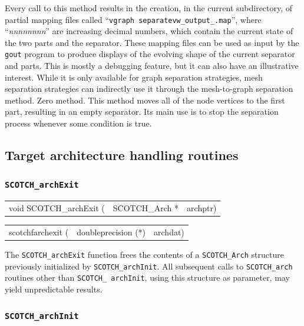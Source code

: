 \begin{itemize}
Every call to this method results in the creation, in the current
subdirectory, of partial mapping files called ``{\tt vgraph\lbt
separate\lbt vw\_\lbt output\_.map}'', where
``{\it nnnnnnnn}'' are increasing decimal numbers, which contain the
current state of the two parts and the separator. These mapping files
can be used as input by the {\tt gout} program to produce displays of
the evolving shape of the current separator and parts. This is mostly
a debugging feature, but it can also have an illustrative interest.
While it is only available for graph separation strategies, mesh
separation strategies can indirectly use it through the mesh-to-graph
separation method.
\iteme[{\tt z}]
Zero method. This method moves all of the node vertices to the first
part, resulting in an empty separator. Its main use is to stop the
separation process whenever some condition is true.
\end{itemize}

\subsection{Target architecture handling routines}
\label{sec-lib-arch-handling}

\subsubsection{{\tt SCOTCH\_archExit}}

\begin{itemize}
\progsyn

{\tt\begin{tabular}{l@{}ll}
void SCOTCH\_archExit ( & SCOTCH\_Arch * & archptr)
\end{tabular}}

{\tt\begin{tabular}{l@{}ll}
scotchfarchexit ( & doubleprecision (*) & archdat)
\end{tabular}}

\progdes

The {\tt SCOTCH\_archExit} function frees the contents of a
{\tt SCOTCH\_\lbt Arch} structure previously initialized by
{\tt SCOTCH\_\lbt archInit}. All subsequent calls to
{\tt SCOTCH\_\lbt arch} routines other than {\tt SCOTCH\_\lbt
archInit}, using this structure as parameter, may yield
unpredictable results.
\end{itemize}

\subsubsection{{\tt SCOTCH\_archInit}}

